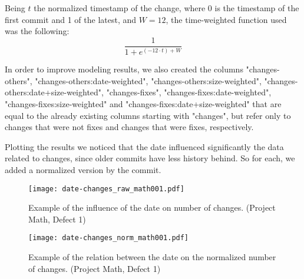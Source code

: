 Being $t$ the normalized timestamp of the change, where 0 is the timestamp of the first commit and 1 of the latest, and $W = 12$, the time-weighted function used was the following:
%
\begin{equation}
  \frac {1} {1 + e^{(-12 \cdot t) + W}}
\end{equation}

In order to improve modeling results, we also created the columns "changes-others", "changes-others:date-weighted", "changes-others:size-weighted", "changes-others:date+size-weighted", 
"changes-fixes", "changes-fixes:date-weighted", "changes-fixes:size-weighted" and "changes-fixes:date+size-weighted" that are equal to the already existing columns starting with
"changes", but refer only to changes that were not fixes and changes that were fixes, respectively.

Plotting the results we noticed that the date influenced significantly the data related to changes, since older commits have less history behind. 
So for each, we added a normalized version by the commit.

\begin{figure}[ht]
  \begin{center}
    \leavevmode
    \texttt{[image: date-changes\_raw\_math001.pdf]}
    \caption{Example of the influence of the date on number of changes. (Project Math, Defect 1)}
    \label{fig:date-changes.raw}
  \end{center}
\end{figure}

\begin{figure}[ht]
  \begin{center}
    \leavevmode
    \texttt{[image: date-changes\_norm\_math001.pdf]}
    \caption{Example of the relation between the date on the normalized number of changes. (Project Math, Defect 1)}
    \label{fig:date-changes.norm}
  \end{center}
\end{figure}


